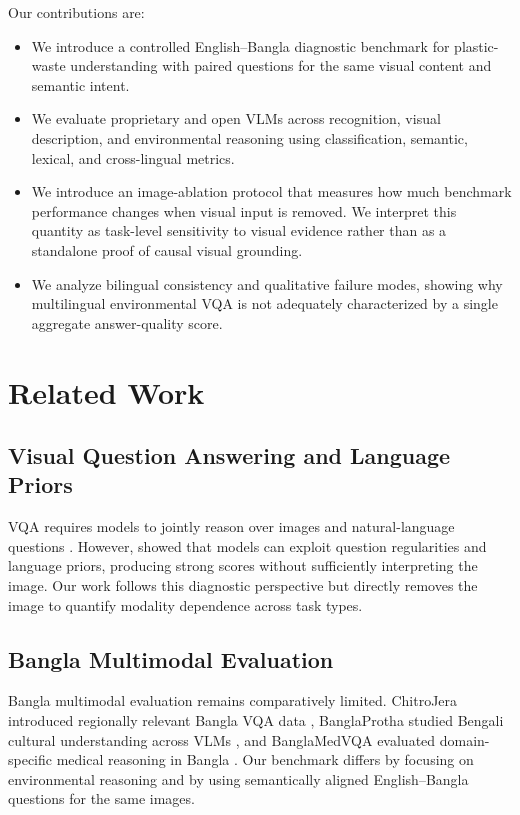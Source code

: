 \documentclass{article}
\begin{document}
Our contributions are:
\begin{itemize}
    \item We introduce a controlled English--Bangla diagnostic benchmark for plastic-waste understanding with paired questions for the same visual content and semantic intent.
    \item We evaluate proprietary and open VLMs across recognition, visual description, and environmental reasoning using classification, semantic, lexical, and cross-lingual metrics.
    \item We introduce an image-ablation protocol that measures how much benchmark performance changes when visual input is removed. We interpret this quantity as task-level sensitivity to visual evidence rather than as a standalone proof of causal visual grounding.
    \item We analyze bilingual consistency and qualitative failure modes, showing why multilingual environmental VQA is not adequately characterized by a single aggregate answer-quality score.
\end{itemize}

\section{Related Work}
\label{sec:related_work}

\subsection{Visual Question Answering and Language Priors}

VQA requires models to jointly reason over images and natural-language questions \citep{antol2015vqa}. However, \citet{goyal2017makingv} showed that models can exploit question regularities and language priors, producing strong scores without sufficiently interpreting the image. Our work follows this diagnostic perspective but directly removes the image to quantify modality dependence across task types.

\subsection{Bangla Multimodal Evaluation}

Bangla multimodal evaluation remains comparatively limited. ChitroJera introduced regionally relevant Bangla VQA data \citep{barua2024chitrojera}, BanglaProtha studied Bengali cultural understanding across VLMs \citep{fahim2026banglaprotha}, and BanglaMedVQA evaluated domain-specific medical reasoning in Bangla \citep{ahmed2026banglamedvqa}. Our benchmark differs by focusing on environmental reasoning and by using semantically aligned English--Bangla questions for the same images.
\end{document}
